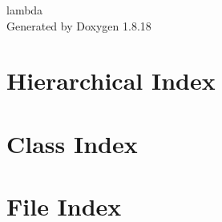 \let\mypdfximage\pdfximage\def\pdfximage{\immediate\mypdfximage}\documentclass[twoside]{book}
\newcommand{\+}{\discretionary{\mbox{\scriptsize$\hookleftarrow$}}{}{}}
\newcommand{\clearemptydoublepage}{%
  \newpage{\pagestyle{empty}\cleardoublepage}%
}
\begin{document}
\hypersetup{pageanchor=false,
             bookmarksnumbered=true,
             pdfencoding=unicode
            }
\begin{titlepage}
\vspace*{7cm}
\begin{center}%
{\Large lambda }\\
\vspace*{1cm}
{\large Generated by Doxygen 1.8.18}\\
\end{center}
\end{titlepage}
\clearemptydoublepage
{}
\tableofcontents
\clearemptydoublepage
{}
\hypersetup{pageanchor=true}

\chapter{Hierarchical Index}

\chapter{Class Index}

\chapter{File Index}

\end{document}
